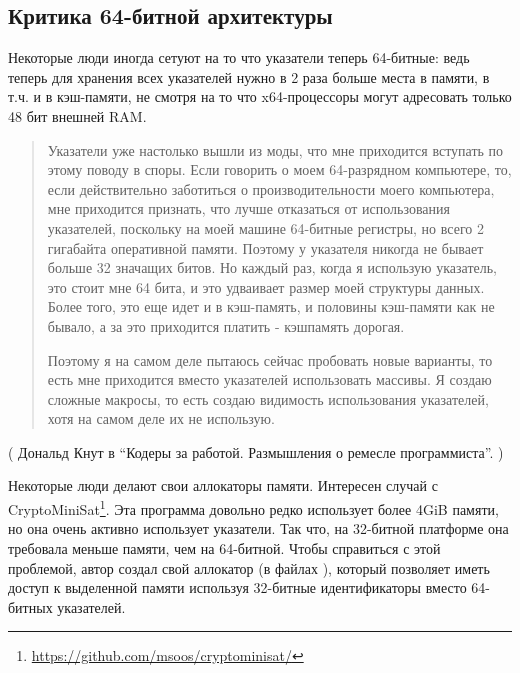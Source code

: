 \subsection{Критика 64-битной архитектуры}

Некоторые люди иногда сетуют на то что указатели теперь 64-битные:
ведь теперь для хранения всех указателей нужно в 2 раза больше места 
в памяти, в т.ч. и в кэш-памяти, не смотря на то что x64-процессоры могут адресовать только 48 бит внешней \ac{RAM}.

\begin{framed}
\begin{quotation}
Указатели уже настолько вышли из моды, что мне приходится вступать по этому поводу в споры. Если говорить о моем 64-разрядном компьютере, то, если действительно заботиться о производительности моего компьютера, мне приходится признать, что лучше отказаться от использования указателей, поскольку на моей машине 64-битные регистры, но всего 2 гигабайта оперативной памяти. Поэтому у указателя никогда не бывает больше 32 значащих битов. Но каждый раз, когда я использую указатель, это стоит мне 64 бита, и это удваивает размер моей структуры данных. Более того, это еще идет и в кэш-память, и половины кэш-памяти как не бывало, а за это приходится платить - кэшпамять дорогая.

Поэтому я на самом деле пытаюсь сейчас пробовать новые варианты, то есть мне приходится вместо указателей использовать массивы. Я создаю сложные макросы, то есть создаю видимость использования указателей, хотя на самом деле их не использую.
\end{quotation}
\end{framed}

( Дональд Кнут в ``Кодеры за работой. Размышления о ремесле программиста''. )

Некоторые люди делают свои аллокаторы памяти.
Интересен случай с CryptoMiniSat\footnote{\url{https://github.com/msoos/cryptominisat/}}.
Эта программа довольно редко использует более 4GiB памяти, но она очень активно использует указатели.
Так что, на 32-битной платформе она требовала меньше памяти, чем на 64-битной.
Чтобы справиться с этой проблемой, автор создал свой аллокатор (в файлах ),
который позволяет иметь доступ к выделенной памяти используя 32-битные идентификаторы вместо 64-битных указателей.

